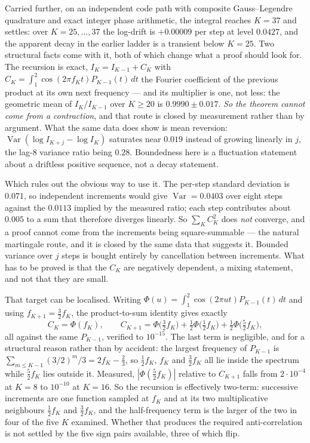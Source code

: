 \documentclass[11pt]{article}
\theoremstyle{remark}
\begin{document}
Carried further, on an independent code path with composite Gauss--Legendre quadrature and exact integer
phase arithmetic, the integral reaches $K=37$ and settles: over $K=25,\dots,37$ the log-drift is
$+0.00009$ per step at level $0.0427$, and the apparent decay in the earlier ladder is a transient below
$K=25$. Two structural facts come with it, both of which change what a proof should look for. The
recursion is exact, $I_K=I_{K-1}+C_K$ with $C_K=\int_1^2\cos(2\pi f_Kt)P_{K-1}(t)\,dt$ the Fourier
coefficient of the previous product at its own next frequency --- and its multiplier is one, not less:
the geometric mean of $I_K/I_{K-1}$ over $K\ge20$ is $0.9990\pm0.017$. \emph{So the theorem cannot come
from a contraction}, and that route is closed by measurement rather than by argument. What the same data
does show is mean reversion: $\operatorname{Var}(\log I_{K+j}-\log I_K)$ saturates near $0.019$ instead
of growing linearly in $j$, the lag-$8$ variance ratio being $0.28$. Boundedness here is a fluctuation
statement about a driftless positive sequence, not a decay statement.

Which rules out the obvious way to use it. The per-step standard deviation is $0.071$, so independent
increments would give $\operatorname{Var}=0.0403$ over eight steps against the $0.0113$ implied by the
measured ratio; each step contributes about $0.005$ to a sum that therefore diverges linearly. So
$\sum_KC_K^2$ does \emph{not} converge, and a proof cannot come from the increments being square-summable
--- the natural martingale route, and it is closed by the same data that suggests it. Bounded variance
over $j$ steps is bought entirely by cancellation between increments. What has to be proved is that the
$C_K$ are negatively dependent, a mixing statement, and not that they are small.

That target can be localised. Writing $\Phi(u)=\int_1^2\cos(2\pi ut)P_{K-1}(t)\,dt$ and using
$f_{K+1}=\tfrac32f_K$, the product-to-sum identity gives exactly
\[
  C_K=\Phi(f_K),\qquad
  C_{K+1}=\Phi\bigl(\tfrac32f_K\bigr)+\tfrac12\Phi\bigl(\tfrac12f_K\bigr)+\tfrac12\Phi\bigl(\tfrac52f_K\bigr),
\]
all against the same $P_{K-1}$, verified to $10^{-15}$. The last term is negligible, and for a structural
reason rather than by accident: the largest frequency of $P_{K-1}$ is
$\sum_{m\le K-1}(3/2)^m/3=2f_K-\tfrac23$, so $\tfrac12f_K$, $f_K$ and $\tfrac32f_K$ all lie inside the
spectrum while $\tfrac52f_K$ lies outside it. Measured, $|\Phi(\tfrac52f_K)|$ relative to $C_{K+1}$ falls
from $2\cdot10^{-4}$ at $K=8$ to $10^{-10}$ at $K=16$. So the recursion is effectively two-term:
successive increments are one function sampled at $f_K$ and at its two multiplicative neighbours
$\tfrac12f_K$ and $\tfrac32f_K$, and the half-frequency term is the larger of the two in four of the five
$K$ examined. Whether that produces the required anti-correlation is not settled by the five sign pairs
available, three of which flip.
\end{document}

